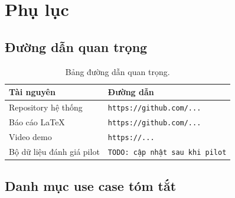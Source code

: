 \chapter*{Phụ lục}

\section*{Đường dẫn quan trọng}

\begin{table}[H]
    \centering
    \begin{tabular}{|p{4.3cm}|p{8.7cm}|}
        \hline
        \textbf{Tài nguyên} & \textbf{Đường dẫn} \\
        \hline
        Repository hệ thống        & \texttt{https://github.com/...} \\
        \hline
        Báo cáo LaTeX              & \texttt{https://github.com/...} \\
        \hline
        Video demo                 & \texttt{https://...} \\
        \hline
        Bộ dữ liệu đánh giá pilot  & \texttt{TODO: cập nhật sau khi pilot} \\
        \hline
    \end{tabular}
    \caption*{Bảng đường dẫn quan trọng.}
\end{table}

\section*{Danh mục use case tóm tắt}

